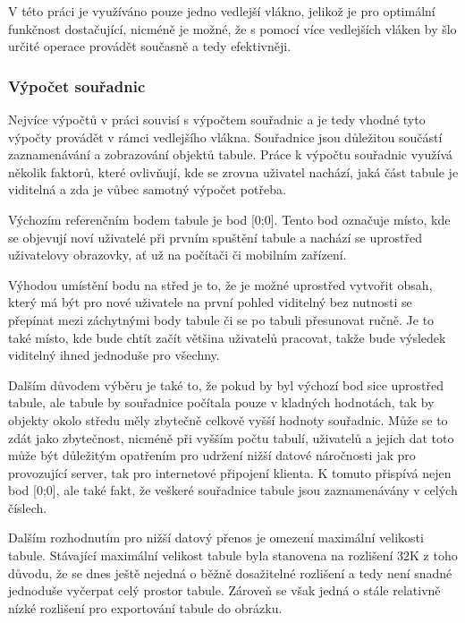 V této práci je využíváno pouze jedno vedlejší vlákno, jelikož je pro optimální funkčnost dostačující, nicméně je možné, že s pomocí více vedlejších vláken by šlo určité operace provádět současně a tedy efektivněji.


\subsubsection{Výpočet souřadnic}
Nejvíce výpočtů v práci souvisí s výpočtem souřadnic a je tedy vhodné tyto výpočty provádět v rámci vedlejšího vlákna.
Souřadnice jsou důležitou součástí zaznamenávání a zobrazování objektů tabule.
Práce k výpočtu souřadnic využívá několik faktorů, které ovlivňují, kde se zrovna uživatel nachází, jaká část tabule je viditelná a zda je vůbec samotný výpočet potřeba.

Výchozím referenčním bodem tabule je bod [0;0].
Tento bod označuje místo, kde se objevují noví uživatelé při prvním spuštění tabule a nachází se uprostřed uživatelovy obrazovky, ať už na počítači či mobilním zařízení.

Výhodou umístění bodu na střed je to, že je možné uprostřed vytvořit obsah, který má být pro nové uživatele na první pohled viditelný bez nutnosti se přepínat mezi záchytnými body tabule či se po tabuli přesunovat ručně.
Je to také místo, kde bude chtít začít většina uživatelů pracovat, takže bude výsledek viditelný ihned jednoduše pro všechny.

Dalším důvodem výběru je také to, že pokud by byl výchozí bod sice uprostřed tabule, ale tabule by souřadnice počítala pouze v kladných hodnotách, tak by objekty okolo středu měly zbytečně celkově vyšší hodnoty souřadnic.
Může se to zdát jako zbytečnost, nicméně při vyšším počtu tabulí, uživatelů a jejich dat toto může být důležitým opatřením pro udržení nižší datové náročnosti jak pro provozující server, tak pro internetové připojení klienta.
K tomuto přispívá nejen bod [0;0], ale také fakt, že veškeré souřadnice tabule jsou zaznamenávány v celých číslech.

Dalším rozhodnutím pro nižší datový přenos je omezení maximální velikosti tabule.
Stávající maximální velikost tabule byla stanovena na rozlišení 32K z toho důvodu, že se dnes ještě nejedná o běžně dosažitelné rozlišení a tedy není snadné jednoduše vyčerpat celý prostor tabule.
Zároveň se však jedná o stále relativně nízké rozlišení pro exportování tabule do obrázku.

